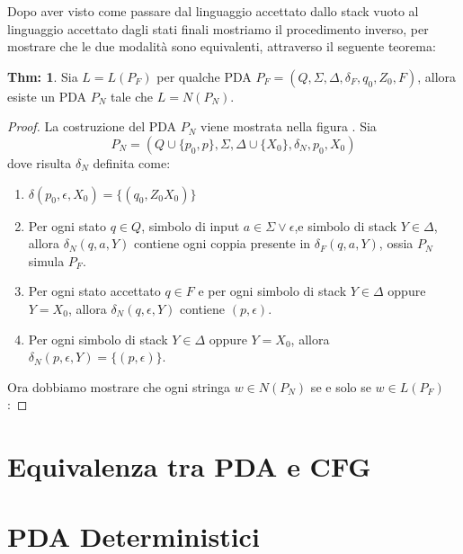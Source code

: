 \documentclass[a4paper]{book}
\theoremstyle{definition}%
\newtheorem{thm}{Thm:}[chapter]
\begin{document}
Dopo aver visto come passare dal linguaggio accettato dallo stack vuoto al linguaggio
accettato dagli stati finali mostriamo il procedimento inverso, per mostrare che
le due modalità sono equivalenti, attraverso il seguente teorema:
\begin{thm}
  Sia $L = L(P_F)$ per qualche PDA $P_F = (Q, \Sigma, \Delta, \delta_F, q_0, Z_0, F)$,
  allora esiste un PDA $P_N$ tale che $L = N(P_N)$.
\end{thm}
\begin{proof}
  La costruzione del PDA $P_N$ viene mostrata nella figura . Sia
  \[ P_N = (Q \cup \{p_0, p\}, \Sigma, \Delta \cup \{X_0\}, \delta_N, p_0, X_0) \]
  dove risulta $\delta_N$ definita come:
  \begin{enumerate}
    \item $\delta(p_0, \epsilon, X_0) = \{(q_0, Z_0X_0)\}$
    \item Per ogni stato $q \in Q$, simbolo di input $a \in \Sigma \lor \epsilon$,e simbolo di stack $Y \in \Delta$,
          allora $\delta_N(q, a, Y)$ contiene ogni coppia presente in $\delta_F(q, a, Y)$,
          ossia $P_N$ simula $P_F$.
    \item Per ogni stato accettato $q \in F$ e per ogni simbolo di stack $Y \in \Delta$ oppure $Y = X_0$,
          allora $\delta_N(q, \epsilon, Y)$ contiene $(p, \epsilon)$.
    \item Per ogni simbolo di stack $Y \in \Delta$ oppure $Y = X_0$, allora $\delta_N(p, \epsilon, Y) = \{(p, \epsilon)\}$.
  \end{enumerate}
  Ora dobbiamo mostrare che ogni stringa $w \in N(P_N)$ se e solo se $w \in L(P_F)$:
\end{proof}

\section{Equivalenza tra PDA e CFG}

\section{PDA Deterministici}
\end{document}
